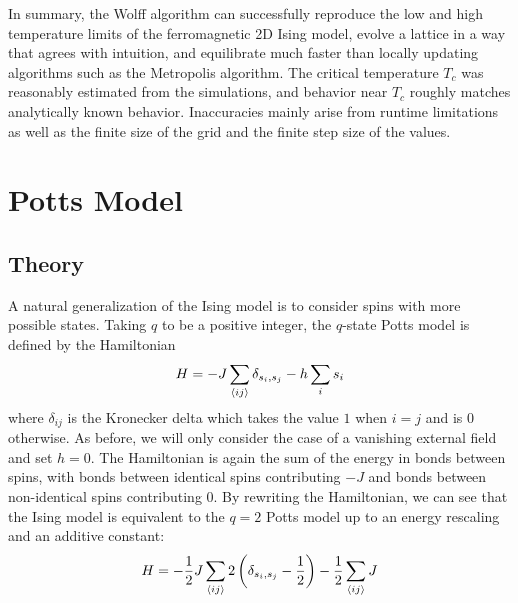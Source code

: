 \documentclass[twocolumn,aps]{revtex4-1} %
\begin{document}
%
%
In summary, the Wolff algorithm can successfully reproduce the low and high temperature limits of the ferromagnetic 2D Ising model, evolve a lattice in a way that agrees with intuition, and equilibrate much faster than locally updating algorithms such as the Metropolis algorithm. The critical temperature $T_c$ was reasonably estimated from the simulations, and behavior near $T_c$ roughly matches analytically known behavior. Inaccuracies mainly arise from runtime limitations as well as the finite size of the grid and the finite step size of the values.





\section{Potts Model}
\subsection{Theory}
A natural generalization of the Ising model is to consider spins with more possible states. Taking $q$ to be a positive integer, the $q$-state Potts model is defined by the Hamiltonian
\begin{equation}
	H = -J\sum_{\braket{ij}}\delta_{s_i,s_j} - h\sum_{i}s_i
\end{equation}
where $\delta_{ij}$ is the Kronecker delta which takes the value $1$ when $i = j$ and is 0 otherwise. As before, we will only consider the case of a vanishing external field and set $h = 0$. The Hamiltonian is again the sum of the energy in bonds between spins, with bonds between identical spins contributing $-J$ and bonds between non-identical spins contributing 0. By rewriting the Hamiltonian, we can see that the Ising model is equivalent to the $q = 2$ Potts model up to an energy rescaling and an additive constant:
\begin{equation}
	H = -\frac{1}{2}J\sum_{\braket{ij}}2\left(\delta_{s_i,s_j} - \frac{1}{2}\right) - \frac{1}{2}\sum_{\braket{ij}}J
\end{equation}
\end{document}
